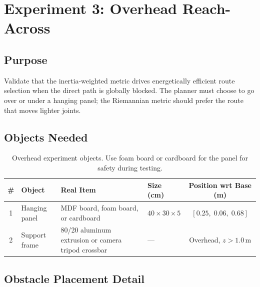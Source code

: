 \documentclass[11pt]{article}
\begin{document}
\newpage
\section{Experiment 3: Overhead Reach-Across}

\subsection{Purpose}
Validate that the inertia-weighted metric drives energetically efficient route selection when the direct path is globally blocked. The planner must choose to go over or under a hanging panel; the Riemannian metric should prefer the route that moves lighter joints.

\subsection{Objects Needed}

\begin{table}[h]
\centering
\begin{tabular}{@{}clllc@{}}
\toprule
\# & Object & Real Item & Size (cm) & Position wrt Base (m) \\
\midrule
1 & Hanging panel & MDF board, foam board, or cardboard & $40 \times 30 \times 5$ & $[0.25,\; 0.06,\; 0.68]$ \\
2 & Support frame & 80/20 aluminum extrusion or camera tripod crossbar & --- & Overhead, $z > 1.0$\,m \\
\bottomrule
\end{tabular}
\caption{Overhead experiment objects. Use foam board or cardboard for the panel for safety during testing.}
\end{table}

\subsection{Obstacle Placement Detail}
\end{document}

